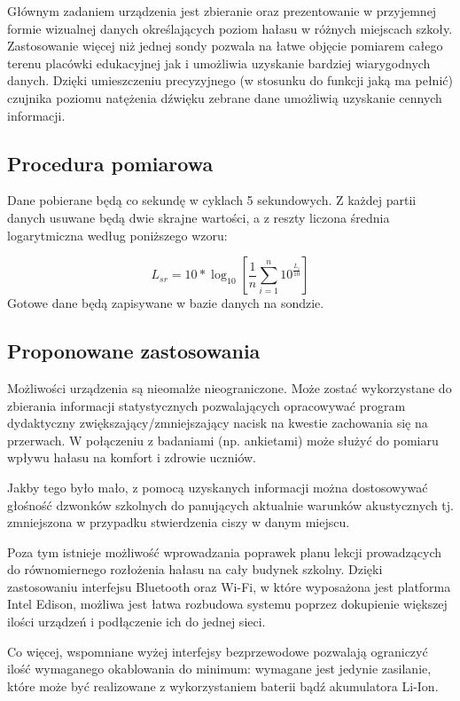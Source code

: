\documentclass[12pt, a4paper]{article}
\begin{document}
Głównym zadaniem urządzenia jest zbieranie oraz prezentowanie w przyjemnej formie wizualnej danych określających poziom hałasu w różnych miejscach szkoły. Zastosowanie więcej niż jednej sondy pozwala na łatwe objęcie pomiarem całego terenu placówki edukacyjnej jak i umożliwia uzyskanie bardziej wiarygodnych danych. Dzięki umieszczeniu precyzyjnego (w stosunku do funkcji jaką ma pełnić) czujnika poziomu natężenia dźwięku zebrane dane umożliwią uzyskanie cennych informacji.

\subsection{Procedura pomiarowa}

Dane pobierane będą co sekundę w cyklach 5 sekundowych. Z każdej partii danych usuwane będą dwie skrajne wartości, a z reszty liczona średnia logarytmiczna według poniższego wzoru\cite{log}:

\Large
\begin{equation}
L_{sr} = 10*\log_{10}\left[\frac{1}{n}\displaystyle\sum_{i=1}^{n}10^{\frac{L_i}{10}}\right]
\end{equation}
\normalsize
Gotowe dane będą zapisywane w bazie danych na sondzie.

\subsection{Proponowane zastosowania}

Możliwości urządzenia są nieomalże nieograniczone. Może zostać wykorzystane do zbierania informacji statystycznych pozwalających opracowywać program dydaktyczny zwiększający/zmniejszający nacisk na kwestie zachowania się na przerwach. W połączeniu z badaniami (np. ankietami) może służyć do pomiaru wpływu hałasu na komfort i zdrowie uczniów.

Jakby tego było mało, z pomocą uzyskanych informacji można dostosowywać głośność dzwonków szkolnych do panujących aktualnie warunków akustycznych tj. zmniejszona w przypadku stwierdzenia ciszy w danym miejscu.

Poza tym istnieje możliwość wprowadzania poprawek planu lekcji prowadzących do równomiernego rozłożenia hałasu na cały budynek szkolny. Dzięki zastosowaniu interfejsu Bluetooth oraz Wi-Fi, w które wyposażona jest platforma Intel Edison, możliwa jest łatwa rozbudowa systemu poprzez dokupienie większej ilości urządzeń i podłączenie ich do jednej sieci.

Co więcej, wspomniane wyżej interfejsy bezprzewodowe pozwalają ograniczyć ilość wymaganego okablowania do minimum: wymagane jest jedynie zasilanie, które może być realizowane z wykorzystaniem baterii bądź akumulatora Li-Ion.
\end{document}
